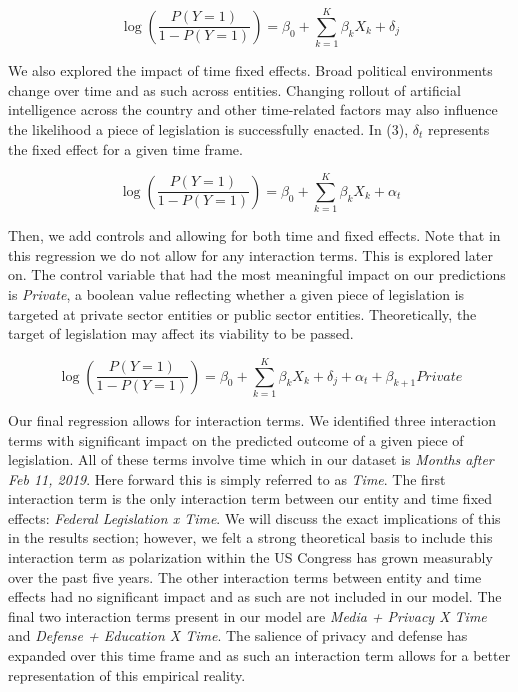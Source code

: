 \documentclass{article}
\begin{document}
\begin{equation}
\log\left( \frac{P(Y=1)}{1 - P(Y=1)} \right) = \beta_0 + \sum_{k=1}^{K} \beta_k X_k + \delta_j
\end{equation}

We also explored the impact of time fixed effects. Broad political environments change over time and as such across entities. Changing rollout of artificial intelligence across the country and other time-related factors may also influence the likelihood a piece of legislation is successfully enacted. In (3), $\delta_t$ represents the fixed effect for a given time frame. 

\begin{equation}
\log\left( \frac{P(Y=1)}{1 - P(Y=1)} \right) = \beta_0 + \sum_{k=1}^{K} \beta_k X_k + \alpha_t
\end{equation}

Then, we add controls and allowing for both time and fixed effects. Note that in this regression we do not allow for any interaction terms. This is explored later on. The control variable that had the most meaningful impact on our predictions is \textit{Private}, a boolean value reflecting whether a given piece of legislation is targeted at private sector entities or public sector entities. Theoretically, the target of legislation may affect its viability to be passed. 


\begin{equation}
\log\left( \frac{P(Y=1)}{1 - P(Y=1)} \right) = \beta_0 + \sum_{k=1}^{K} \beta_k X_k + \delta_j + \alpha_t + \beta_{k+1}Private
\end{equation}

Our final regression allows for interaction terms. We identified three interaction terms with significant impact on the predicted outcome of a given piece of legislation. All of these terms involve time which in our dataset is \textit{Months after Feb 11, 2019}. Here forward this is simply referred to as \textit{Time}. The first interaction term is the only interaction term between our entity and time fixed effects: \textit{Federal Legislation x Time}. We will discuss the exact implications of this in the results section; however, we felt a strong theoretical basis to include this interaction term as polarization within the US Congress has grown measurably over the past five years. The other interaction terms between entity and time effects had no significant impact and as such are not included in our model. The final two interaction terms present in our model are \textit{Media + Privacy X Time} and \textit{Defense + Education X Time}. The salience of privacy and defense has expanded over this time frame and as such an interaction term allows for a better representation of this empirical reality. 
\end{document}
